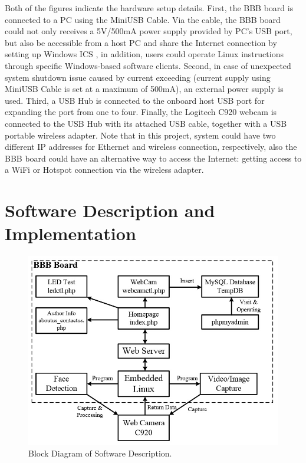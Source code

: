 \documentclass[12pt,journal,draftclsnofoot,onecolumn]{IEEEtran}
\begin{document}
Both of the figures indicate the hardware setup details. First, the BBB board is connected to a PC using the MiniUSB Cable. Via the cable, the BBB board could not only receives a 5V/500mA power supply provided by PC's USB port, but also be accessible from a host PC and share the Internet connection by setting up Windows ICS \cite{windowsICS}, in addition, users could operate Linux instructions through specific Windows-based software clients. Second, in case of unexpected system shutdown issue caused by current exceeding (current supply using MiniUSB Cable is set at a maximum of 500mA), an external power supply is used. Third, a USB Hub is connected to the onboard host USB port for expanding the port from one to four. Finally, the Logitech C920 webcam is connected to the USB Hub with its attached USB cable, together with a USB portable wireless adapter. Note that in this project, system could have two different IP addresses for Ethernet and wireless connection, respectively, also the BBB board could have an alternative way to access the Internet: getting access to a WiFi or Hotspot connection via the wireless adapter.


\section{Software Description and Implementation}\label{SfDes}
\begin{figure}[ht]
	\centering
	\includegraphics[width=5in]{./figs/sw1.jpg}
	\caption{Block Diagram of Software Description.}
	\label{sw1}
\end{figure}
\end{document}
